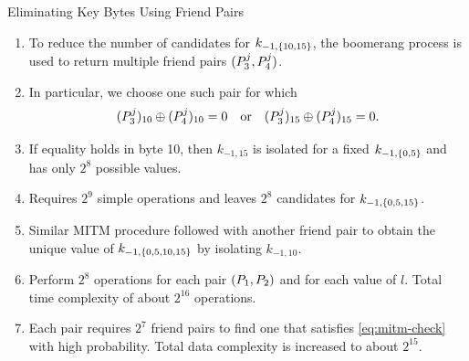 \documentclass[notheorems]{beamer}
\theoremstyle{definition}
\theoremstyle{example}
\begin{document}
    \begin{frame}[<+->]{Eliminating Key Bytes Using Friend Pairs}
        \begin{enumerate}
            \item To reduce the number of candidates for \(k_{-1, \{10,
            15\}}\), the boomerang process is used to return multiple friend
            pairs \((P_3^j, P_4^j)\).
            \item In particular, we choose one such pair for which
            \begin{equation}
                (P_3^j)_{10} \oplus (P_4^j)_{10} = 0 \quad \textrm{or} \quad (P_3^j)_{15} \oplus (P_4^j)_{15} = 0.
                \label{eq:mitm-check}
            \end{equation}
            \item If equality holds in byte 10, then \(k_{-1, 15}\) is isolated
            for a fixed \(k_{-1, \{0, 5\}}\) and has only \(2^8\) possible
            values.
            \item Requires \(2^9\) simple operations and leaves \(2^8\)
            candidates for \(k_{-1, \{0, 5, 15\}}\).
            \item Similar MITM procedure followed with another friend pair to
            obtain the unique value of \(k_{-1, \{0, 5, 10, 15\}}\) by
            isolating \(k_{-1, 10}\).
            \item Perform \(2^8\) operations for each pair \((P_1, P_2)\)
            and for each value of \(l\). Total time complexity of about
            \(2^{16}\) operations.
            \item Each pair requires \(2^7\) friend pairs to find one that
            satisfies \eqref{eq:mitm-check} with high probability. Total data
            complexity is increased to about \(2^{15}\).
        \end{enumerate} 
    \end{frame}
\end{document}
